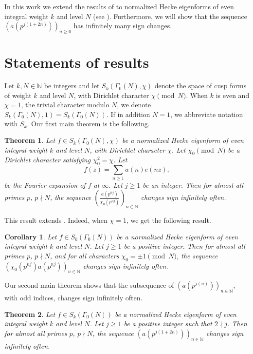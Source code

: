 \documentclass[smallcondensed]{svjour3}
\newtheorem{thm}{Theorem}
\newtheorem{cor}{Corollary}
\begin{document}
In this work we extend the results of \cite{kohnen14} to normalized Hecke eigenforms of even integral weight $k$ and level $N$ (see ). Furthermore, we will show that the sequence $(a(p^{j(1+2n)}))_{n\geq 0}$ has infinitely many sign changes.

\section{Statements of results}

Let $k,N\in{\mathbb N}$ be integers and let $S_k(\Gamma_{0}(N),\chi)$ denote the space of cusp forms of weight $k$ and level $N$, with Dirichlet character $\chi\pmod N$. When $k$ is even and $\chi=1$, the trivial character modulo $N$, we denote $S_k(\Gamma_{0}(N),1)=S_k(\Gamma_{0}(N))$. If in addition $N = 1$, we abbreviate notation with $S_k$. Our first main theorem is the following.

\begin{thm}
Let $f\in S_k(\Gamma_{0}(N),\chi)$ be a normalized Hecke eigenform of even integral weight $k$ and level $N$, with Dirichlet character $\chi$. Let $\chi_{0}\pmod N$  be a Dirichlet character satisfying $\chi_{0}^{2}=\chi$. Let
$$
f(z)=\sum_{n\ge 1}a(n)e(nz),
$$
be the Fourier expansion of $f$ at $\infty$. Let $j\ge1$ be an integer. Then for almost all primes $p$, $p\nmid N$, the sequence $\left(\frac{a(p^{nj})}{\chi_{0}(p^{nj})}\right)_{n\in{\mathbb N}}$ changes sign infinitely often.
\end{thm}

This result extends \cite[Theorem 2.1]{kohnen14}. Indeed, when $\chi=1$, we get the following result. 

\begin{cor} 
Let $f\in S_k(\Gamma_{0}(N))$ be a normalized Hecke eigenform of even integral weight $k$ and level $N$. Let $j\ge1$ be a positive integer. Then for almost all primes $p$, $p\nmid N$, and for all characters $\chi_{0}=\pm 1\pmod N$, the sequence $\left(\chi_{0}(p^{nj})a(p^{nj})\right)_{n\in{\mathbb N}}$ changes sign infinitely often.
\end{cor}

Our second main theorem shows that the subsequence of $\left(a(p^{j(n)})\right)_{n\in{\mathbb N}}$, with odd indices, changes sign infinitely often.

\begin{thm}
Let $f\in S_k(\Gamma_{0}(N))$ be a normalized Hecke eigenform of even integral weight $k$ and level $N$. Let $j\ge1$ be a positive integer such that $2\nmid j$. Then for almost all primes $p$, $p\nmid N$, the sequence $\left(a(p^{j(1+2n)})\right)_{n\in{\mathbb N}}$ changes sign infinitely often.
\end{thm}
\end{document}
